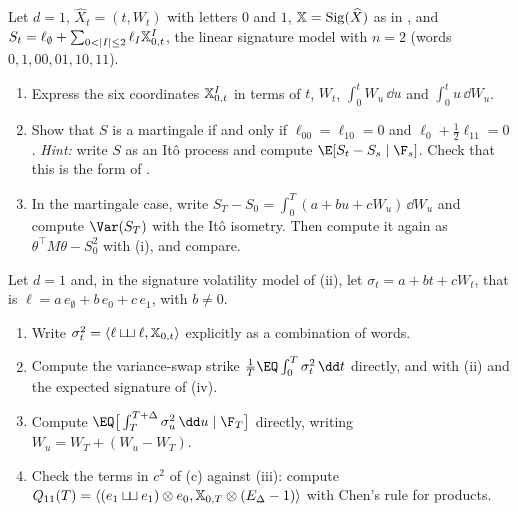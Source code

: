 \begin{exercise}\label{ex:sig-martingale-n2}
\medium Let $d=1$, $\widehat X_t=(t,W_t)$ with letters $0$ and $1$, $\mathbb X=\operatorname{Sig}(\widehat X)$ as in
, and $S_t=\ell_\emptyset+\sum_{0<|I|\le2}\ell_I\sigX^I_{0,t}$, the linear signature model with
$n=2$ (words $0,1,00,01,10,11$).
\begin{enumerate}[label=(\alph*)]
  \item Express the six coordinates $\mathbb X^I_{0,t}$ in terms of $t$, $W_t$, $\int_0^tW_u\,\dd u$ and $\int_0^tu\,\dd W_u$.
  \item Show that $S$ is a martingale if and only if $\ell_{00}=\ell_{10}=0$ and $\ell_0+\frac12\ell_{11}=0$. \emph{Hint:}
    write $S$ as an It\^o process and compute $\E[S_t-S_s\mid\F_s]$. Check that this is the form of
    .
  \item In the martingale case, write $S_T-S_0=\int_0^T(a+bu+cW_u)\,\dd W_u$ and compute $\Var(S_T)$ with the It\^o
    isometry. Then compute it again as $\theta^\top M\theta-S_0^2$ with (i), and
    compare.
\end{enumerate}
\end{exercise}

\begin{exercise}\label{ex:sig-vix}
\medium Let $d=1$ and, in the signature volatility model of (ii), let
$\sigma_t=a+bt+cW_t$, that is $\ell=a\,e_\emptyset+b\,e_0+c\,e_1$, with $b\ne0$.
\begin{enumerate}[label=(\alph*)]
  \item Write $\sigma_t^2=\langle\ell\mathbin{\sqcup\mkern-3mu\sqcup}\ell,\mathbb X_{0,t}\rangle$ explicitly as a combination of words.
  \item Compute the variance-swap strike $\frac1T\EQ\int_0^T\sigma_t^2\,\dd t$ directly, and with
    (ii) and the expected signature of (iv).
  \item Compute $\EQ\big[\int_T^{T+\Delta}\sigma_u^2\,\dd u\mid\F_T\big]$ directly, writing
    $W_u=W_T+(W_u-W_T)$.
  \item Check the terms in $c^2$ of (c) against (iii): compute
    $Q_{11}(T)=\langle(e_1\mathbin{\sqcup\mkern-3mu\sqcup} e_1)\otimes e_0,\mathbb X_{0,T}\otimes(E_\Delta-1)\rangle$ with Chen's rule for products.
\end{enumerate}
\end{exercise}

